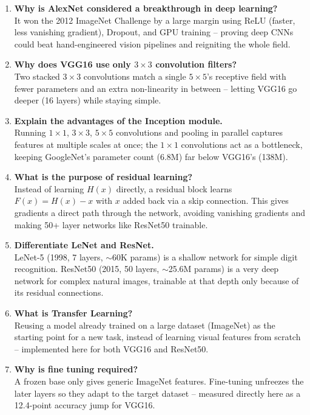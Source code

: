 \documentclass[11pt]{article}
\begin{document}
\begin{enumerate}

\item \textbf{Why is AlexNet considered a breakthrough in deep learning?}\\
It won the 2012 ImageNet Challenge by a large margin using ReLU
(faster, less vanishing gradient), Dropout, and GPU training --
proving deep CNNs could beat hand-engineered vision pipelines and
reigniting the whole field.

\item \textbf{Why does VGG16 use only $3\times3$ convolution filters?}\\
Two stacked $3\times3$ convolutions match a single $5\times5$'s
receptive field with fewer parameters and an extra non-linearity in
between -- letting VGG16 go deeper (16 layers) while staying simple.

\item \textbf{Explain the advantages of the Inception module.}\\
Running $1\times1$, $3\times3$, $5\times5$ convolutions and pooling
in parallel captures features at multiple scales at once; the
$1\times1$ convolutions act as a bottleneck, keeping GoogleNet's
parameter count (6.8M) far below VGG16's (138M).

\item \textbf{What is the purpose of residual learning?}\\
Instead of learning $H(x)$ directly, a residual block learns
$F(x)=H(x)-x$ with $x$ added back via a skip connection. This gives
gradients a direct path through the network, avoiding vanishing
gradients and making 50+ layer networks like ResNet50 trainable.

\item \textbf{Differentiate LeNet and ResNet.}\\
LeNet-5 (1998, 7 layers, $\sim$60K params) is a shallow network for
simple digit recognition. ResNet50 (2015, 50 layers, $\sim$25.6M
params) is a very deep network for complex natural images, trainable
at that depth only because of its residual connections.

\item \textbf{What is Transfer Learning?}\\
Reusing a model already trained on a large dataset (ImageNet) as the
starting point for a new task, instead of learning visual features
from scratch -- implemented here for both VGG16 and ResNet50.

\item \textbf{Why is fine tuning required?}\\
A frozen base only gives generic ImageNet features. Fine-tuning
unfreezes the later layers so they adapt to the target dataset --
measured directly here as a 12.4-point accuracy jump for VGG16.


\end{enumerate}
\end{document}
